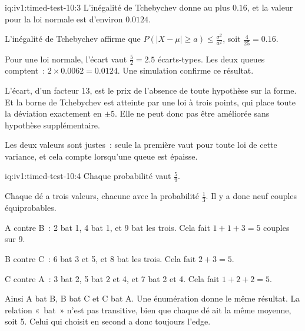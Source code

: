 \begin{solution}{iq:iv1:timed-test-10:3}
L'inégalité de Tchebychev donne au plus $0.16$, et la valeur pour la loi normale est d'environ $0.0124$.

L'inégalité de Tchebychev affirme que $P(|X - \mu| \ge a) \le \frac{\sigma^2}{a^2}$, soit $\frac{4}{25} = 0.16$.

Pour une loi normale, l'écart vaut $\frac52 = 2.5$ écarts-types. Les deux queues comptent~: $2 \times 0.0062 = 0.0124$. Une simulation confirme ce résultat.

L'écart, d'un facteur 13, est le prix de l'absence de toute hypothèse sur la forme. Et la borne de Tchebychev est atteinte par une loi à trois points, qui place toute la déviation exactement en $\pm5$. Elle ne peut donc pas être améliorée sans hypothèse supplémentaire.

Les deux valeurs sont justes~: seule la première vaut pour toute loi de cette variance, et cela compte lorsqu'une queue est épaisse.

\end{solution}

\begin{solution}{iq:iv1:timed-test-10:4}
Chaque probabilité vaut $\frac59$.

Chaque dé a trois valeurs, chacune avec la probabilité $\frac13$. Il y a donc neuf couples équiprobables.

A contre B~: 2 bat 1, 4 bat 1, et 9 bat les trois. Cela fait $1 + 1 + 3 = 5$ couples sur 9.

B contre C~: 6 bat 3 et 5, et 8 bat les trois. Cela fait $2 + 3 = 5$.

C contre A~: 3 bat 2, 5 bat 2 et 4, et 7 bat 2 et 4. Cela fait $1 + 2 + 2 = 5$.

Ainsi A bat B, B bat C et C bat A. Une énumération donne le même résultat. La relation «~bat~» n'est pas transitive, bien que chaque dé ait la même moyenne, soit 5. Celui qui choisit en second a donc toujours l'edge.

\end{solution}

